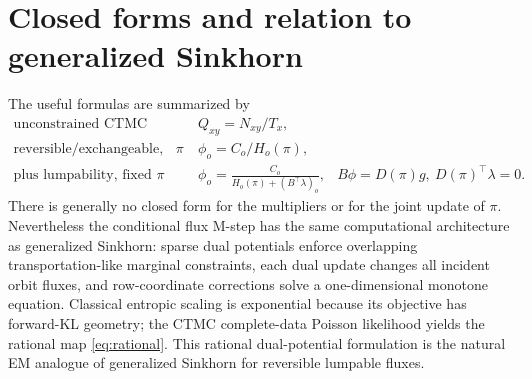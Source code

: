 \documentclass[10pt]{article}
\begin{document}
\section{Closed forms and relation to generalized Sinkhorn}
The useful formulas are summarized by
\begin{equation}
\begin{array}{rcll}
\text{unconstrained CTMC}&&Q_{xy}=N_{xy}/T_x,&\\[2mm]
\text{reversible/exchangeable, fixed }\pi&&\phi_o=C_o/H_o(\pi),&\\[2mm]
\text{plus lumpability, fixed }\pi&&
\displaystyle \phi_o=\frac{C_o}{H_o(\pi)+(B^\top\lambda)_o},&
B\phi=D(\pi)g,\ D(\pi)^\top\lambda=0.
\end{array}
\end{equation}
There is generally no closed form for the multipliers or for the joint update of $\pi$.  Nevertheless the conditional flux M-step has the same computational architecture as generalized Sinkhorn: sparse dual potentials enforce overlapping transportation-like marginal constraints, each dual update changes all incident orbit fluxes, and row-coordinate corrections solve a one-dimensional monotone equation.  Classical entropic scaling is exponential because its objective has forward-KL geometry; the CTMC complete-data Poisson likelihood yields the rational map \eqref{eq:rational}.  This rational dual-potential formulation is the natural EM analogue of generalized Sinkhorn for reversible lumpable fluxes.
\end{document}
